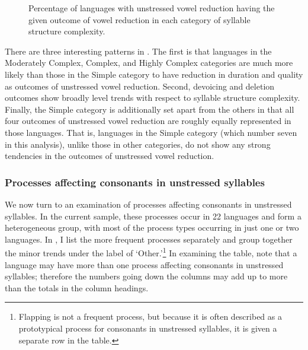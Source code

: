 \begin{figure}
\caption{\label{fig:5.3} Percentage of languages with unstressed vowel reduction having the given outcome of vowel reduction in each category of syllable structure complexity.}
\end{figure}

  There are three interesting patterns in . The first is that languages in the  Moderately Complex, Complex, and Highly Complex categories are much more likely than those in the Simple category to have reduction in duration and quality as outcomes of unstressed vowel reduction. Second, devoicing and deletion outcomes show broadly level trends with respect to syllable structure complexity. Finally, the Simple category is additionally set apart from the others in that all four outcomes of unstressed vowel reduction are roughly equally represented in those languages. That is, languages in the Simple category (which number seven in this analysis), unlike those in other categories, do not show any strong tendencies in the outcomes of unstressed vowel reduction.

\subsubsection{{Processes} {affecting} {consonants} {in} {unstressed} {syllables}}\label{sec:5.4.3.2}

  We now turn to an examination of processes affecting consonants in unstressed syllables. In the current sample, these processes occur in 22 languages and form a heterogeneous group, with most of the process types occurring in just one or two languages. In , I list the more frequent processes separately and group together the minor trends under the label of ‘Other.’\footnote{{Flapping is not a frequent process, but because it is often described as a prototypical process for consonants in unstressed syllables, it is given a separate row in the table.}} In examining the table, note that a language may have more than one process affecting consonants in unstressed syllables; therefore the numbers going down the columns may add up to more than the totals in the column headings.

